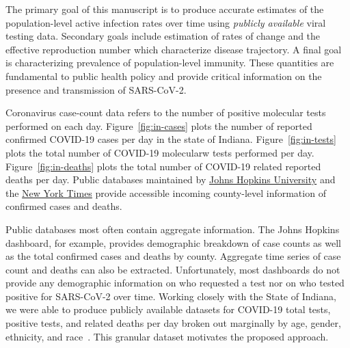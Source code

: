 \documentclass[11pt]{amsart}
\numberwithin{equation}{section}
\theoremstyle{plain}
\begin{document}
The primary goal of this manuscript is to produce accurate estimates of the population-level active infection rates over time using \emph{publicly available} viral testing data.  Secondary goals include estimation of rates of change and the effective reproduction number which characterize disease trajectory.  A final goal is characterizing prevalence of population-level immunity. These quantities are fundamental to public health policy and provide critical information on the presence and transmission of SARS-CoV-2.



Coronavirus case-count data refers to the number of positive molecular tests performed on each day.  Figure~\ref{fig:in-cases} plots the number of reported confirmed COVID-19 cases per day in the state of Indiana.  Figure~\ref{fig:in-tests} plots the total number of COVID-19 molecularw tests performed per day. Figure~\ref{fig:in-deaths} plots the total number of COVID-19 related reported deaths per day. Public databases maintained by \href{https://bit.ly/2UqFSuA}{Johns Hopkins University} and the \href{https://bit.ly/2vUHfrK}{New York Times} provide accessible incoming county-level information of confirmed cases and deaths.

Public databases most often contain aggregate information.  The Johns Hopkins dashboard, for example, provides demographic breakdown of case counts as well as the total confirmed cases and deaths by county.  Aggregate time series of case count and deaths can also be extracted.  Unfortunately, most dashboards do not provide any demographic information on who requested a test nor on who tested positive for SARS-CoV-2 over time. Working closely with the State of Indiana, we were able to produce publicly available datasets for COVID-19 total tests, positive tests, and related deaths per day broken out marginally by age, gender, ethnicity, and race~\citep{IndianaData2021}.  This granular dataset motivates the proposed approach.
%



\end{document}
